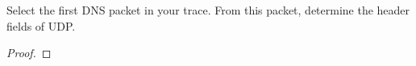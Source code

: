 \documentclass[../../main.tex]{subfiles}
\begin{document}
\begin{wts}
Select the first DNS packet in your trace. From this packet, determine the header fields of UDP.
\end{wts}
\begin{proof}

\end{proof}
\end{document}
